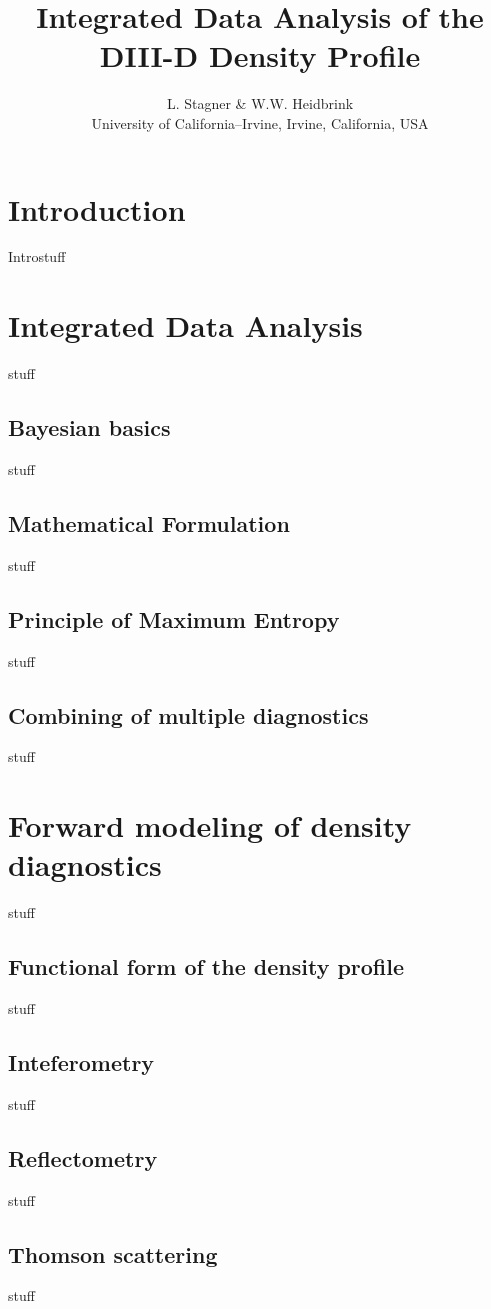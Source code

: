 \documentclass	[12pt]{article}
\begin{document}
\title{\bf{Integrated Data Analysis of the DIII-D Density Profile}}
\author{L. Stagner \& W.W. Heidbrink \\ University of California--Irvine, Irvine, California, USA}
\date{}
\maketitle
\begin{abstract}
\end{abstract}
\section{Introduction}
Introstuff \cite{sivia2006data}

\section{Integrated Data Analysis}
stuff
\subsection{Bayesian basics}
stuff
\subsection{Mathematical Formulation}
stuff
\subsection{Principle of Maximum Entropy}
stuff
\subsection{Combining of multiple diagnostics}
stuff
\section{Forward modeling of density diagnostics}
stuff
\subsection{Functional form of the density profile}
stuff
\subsection{Inteferometry}
stuff
\subsection{Reflectometry}
stuff
\subsection{Thomson scattering}
stuff
\end{document}
